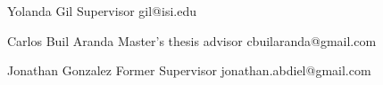 
\begin{cventries}
  {Yolanda Gil} %
  {Supervisor} %
  {gil@isi.edu} %
  {} %

  {Carlos Buil Aranda} %
  {Master’s thesis advisor} %
  {cbuilaranda@gmail.com} %
  {} %

  {Jonathan Gonzalez} %
  {Former Supervisor} %
  {jonathan.abdiel@gmail.com} %
  {} %
\end{cventries}